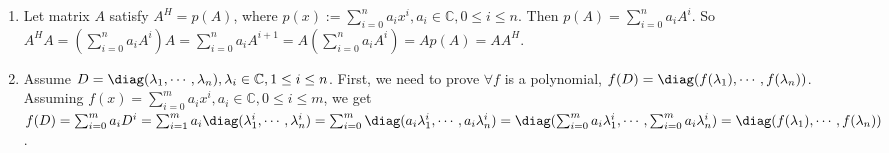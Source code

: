 \documentclass{ctexart}
\begin{document}
\begin{solution}
 \begin{enumerate}
   \item Let matrix \(A \) satisfy \(A^H = p(A) \), where \(p(x):=\sum_{i=0}^{n}a_ix^i,a_i \in \mathbb{C},0 \leq i \leq n \).
     Then \(p(A)=\sum_{i=0}^{n}a_iA^i \). So \(A^HA=(\sum_{i=0}^{n}a_iA^i)A=\sum_{i=0}^{n}a_iA^{i + 1}=A(\sum_{i=0}^{n}a_iA^i)=Ap(A)=AA^H \).
   \item Assume \(D=\diag(\lambda_1,\cdots,\lambda_n), \lambda_i \in \mathbb{C}, 1 \leq i \leq n  \). 
     First, we need to prove \(\forall f \) is a polynomial, \(f(D)=\diag(f(\lambda_1),\cdots,f(\lambda_n)) \).
     Assuming \(f(x)=\sum_{i=0}^{m}a_ix^i,a_i \in \mathbb{C},0 \leq i \leq m \), we get\( f(D)=\sum_{i=0}^{m}a_iD^i=\sum_{i=1}^{m}a_i \diag(\lambda_1^i,\cdots,\lambda_n^i)=
     \sum_{i=0}^{m}\diag(a_{i}\lambda _1^i,\cdots,a_i \lambda _n^i)=\diag(\sum_{i=0}^{m}a_{i}\lambda _1^i,\cdots,\sum_{i=0}^{m}a_i \lambda _n^i)=\diag(f(\lambda_1),\cdots,f(\lambda_n))\). 
     

\end{enumerate}
\end{solution}
\end{document}

